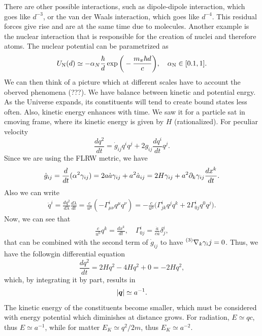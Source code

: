 There are other possible interactions, such as dipole-dipole interaction, which goes like $d^{-3}$, or the van der Waals interaction, which goes like $d^{-4}$. This residual forces give rise and are at the same time due to molecules. Another example is the nuclear interaction that is responsible for the creation of nuclei and therefore atoms. The nuclear potential can be parametrized as 
\begin{equation}
    U_{\mathrm{N}}(d) \simeq -\alpha_N\frac{\hbar}{d}\exp{\bigg(-\frac{m_\pi\hbar d}{c}\bigg)},\quad \alpha_{\mathrm{N}} \in [0.1,1].
\end{equation}
We can then think of a picture which at different scales have to account the oberved phenomena (???). We have balance between kinetic and potential enrgy. As the Universe expands, its constituents will tend to create bound states less often. Also, kinetic energy enhances with time. We saw it for a particle sat in cmoving frame, where its kinetic energy is given by $H$ (rationalized). For peculiar velocity
\begin{equation}
    \frac{dq^2}{dt} = \dot{g}_{ij}q^iq^j + 2g_{ij}\frac{dq^i}{dt}q^j.
\end{equation}
Since we are using the FLRW metric, we have 
\begin{equation}
    \dot{g}_{ij} = \frac{d}{dt}(\alpha^2\gamma_{ij}) = 2a\dot{a}\gamma_{ij} + a^2\dot{a}_{ij} = 2H\gamma_{ij} + a^2\partial_k\gamma_{ij}\frac{dx^k}{dt}.
\end{equation}
Also we can write 
\begin{equation}
    \begin{split}
        \dot{q}^i = \frac{dq^2}{d\lambda}\frac{d\lambda}{dt} = \frac{c}{u^0}(-\Gamma^i_{\mu\nu}q^\mu q^\nu) = -\frac{c}{u^0}\bigg(\Gamma^i_{jk}q^jq^k + 2\Gamma^i_{0j}q^0q^j\bigg).
    \end{split}
\end{equation}
Now, we can see that 
\begin{eqnarray}
    \frac{c}{u^0}q^k = \frac{dx^k}{dt},\quad \Gamma^i_{0j} = \frac{\dot{a}}{ca}\delta^i_j,
\end{eqnarray}
that can be combined with the second term of $\dot{g}_{ij}$ to have $\prescript{(3)}{}{\nabla_k\gamma_ij} = 0$. Thus, we have the followgin differential equation 
\begin{equation}
    \frac{dq^2}{dt} = 2Hq^2 - 4Hq^2 + 0 = -2Hq^2,
\end{equation}
which, by integrating it by part, results in 
\begin{equation}
    |\bm{q}| \simeq a^{-1}.
\end{equation}
The kinetic energy of the constituents become smaller, which must be considered with energy potential which diminishes at distance grows. For radiation, $E \simeq qc$, thus $E \simeq a^{-1}$, while for matter $E_K \simeq q^2/2m$, thus $E_K \simeq a^{-2}$. 
